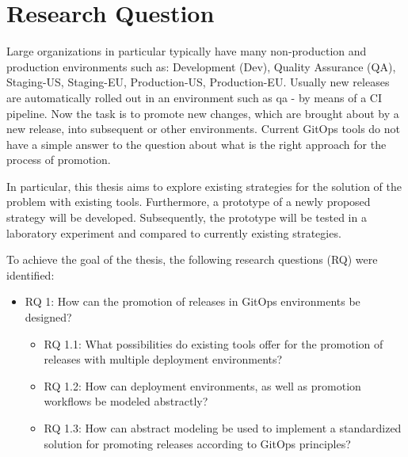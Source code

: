 \chapter{Research Question}

%
Large organizations in particular typically have many
non-production and production environments
such as:
Development (Dev),
Quality Assurance (QA),
Staging-US,
Staging-EU,
Production-US,
Production-EU.
Usually new releases are automatically rolled out in an environment
such as qa - by means of a CI pipeline.
Now the task is to promote
new changes, which are brought about by a new release,
into subsequent or other environments.
Current GitOps tools do not have a simple answer to
the question about what is the right approach for the process of promotion.
\bigskip

\noindent
In particular, this thesis aims to explore
existing strategies for the solution of the problem
with existing tools.
Furthermore, a prototype of a newly proposed strategy will be developed.
Subsequently, the prototype will be tested in a laboratory experiment
and compared to currently existing strategies.
\bigskip

\noindent
To achieve the goal of the thesis, the following research questions (RQ) were identified:

\begin{itemize}
	\item RQ 1: How can the promotion of releases in GitOps environments be designed?
	\begin{itemize}
		\item RQ 1.1: What possibilities do existing tools offer for the promotion of releases with multiple deployment environments?
		\item RQ 1.2: How can deployment environments, as well as promotion workflows be modeled abstractly?
		\item RQ 1.3: How can abstract modeling be used to implement a standardized solution for promoting releases according to GitOps principles?
	\end{itemize}
\end{itemize}



